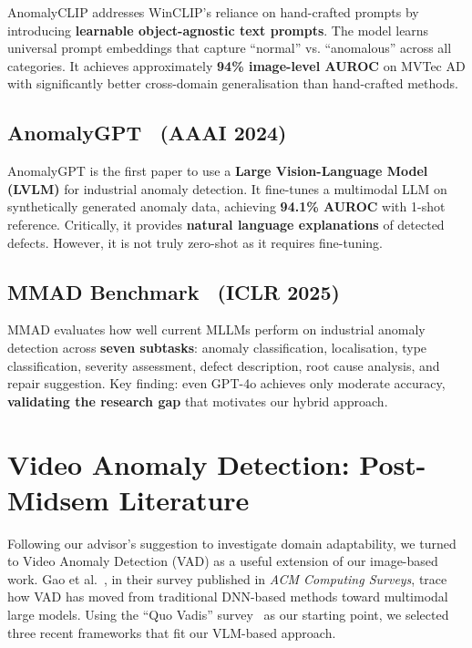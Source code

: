 AnomalyCLIP addresses WinCLIP's reliance on hand-crafted prompts by introducing \textbf{learnable object-agnostic text prompts}. The model learns universal prompt embeddings that capture ``normal'' vs. ``anomalous'' across all categories. It achieves approximately \textbf{94\% image-level AUROC} on MVTec AD with significantly better cross-domain generalisation than hand-crafted methods.

\subsection{AnomalyGPT~\cite{gu2024anomalygpt} (AAAI 2024)}

AnomalyGPT is the first paper to use a \textbf{Large Vision-Language Model (LVLM)} for industrial anomaly detection. It fine-tunes a multimodal LLM on synthetically generated anomaly data, achieving \textbf{94.1\% AUROC} with 1-shot reference. Critically, it provides \textbf{natural language explanations} of detected defects. However, it is not truly zero-shot as it requires fine-tuning.

\subsection{MMAD Benchmark~\cite{jiang2025mmad} (ICLR 2025)}

MMAD evaluates how well current MLLMs perform on industrial anomaly detection across \textbf{seven subtasks}: anomaly classification, localisation, type classification, severity assessment, defect description, root cause analysis, and repair suggestion. Key finding: even GPT-4o achieves only moderate accuracy, \textbf{validating the research gap} that motivates our hybrid approach.

\section{Video Anomaly Detection: Post-Midsem Literature}
\label{sec:video_ad}

Following our advisor's suggestion to investigate domain adaptability, we turned to Video Anomaly Detection (VAD) as a useful extension of our image-based work. Gao et al.~\cite{gao2025survey}, in their survey published in \textit{ACM Computing Surveys}, trace how VAD has moved from traditional DNN-based methods toward multimodal large models. Using the ``Quo Vadis'' survey~\cite{quovadis2024} as our starting point, we selected three recent frameworks that fit our VLM-based approach.

